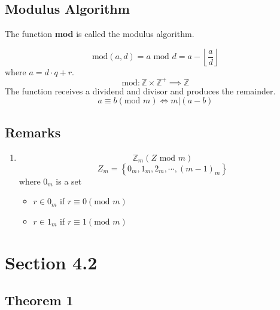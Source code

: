 \documentclass{article}
\begin{document}
\subsection{Modulus Algorithm}

The function \textbf{mod} is called the modulus algorithm.

\begin{equation}
	\text{mod}(a, d) = a \text{ mod } d = a - \left\lfloor \frac{ a }{ d } \right\rfloor
\end{equation}
where $ a = d \cdot q + r $.
\begin{equation}
	\text{mod}: \mathbb{Z} \times \mathbb{Z}^{+} \implies \mathbb{Z}
\end{equation}
The function receives a dividend and divisor and produces the remainder.
\begin{equation}
	a \equiv b \left( \text{mod } m \right) \iff m \vert \left( a - b \right)
\end{equation}

\subsection{Remarks}

\begin{enumerate}
	\item
	      \begin{equation*}
		      \mathbb{Z}_{m} \left( Z \text{ mod } m \right)
	      \end{equation*}
	      \begin{equation*}
		      Z_{m} = \left\{ 0_m, 1_m, 2_m, \cdots, (m - 1)_m \right\}
	      \end{equation*}
	      where $ 0_m $ is a set
	      \begin{itemize}
		      \item $ r \in 0_m $ if $ r \equiv 0 \left( \text{mod } m \right) $
		      \item $ r \in 1_m $ if $ r \equiv 1 \left( \text{mod } m \right) $
	      \end{itemize}
\end{enumerate}

\section{Section 4.2}

\subsection{Theorem 1}
\end{document}
